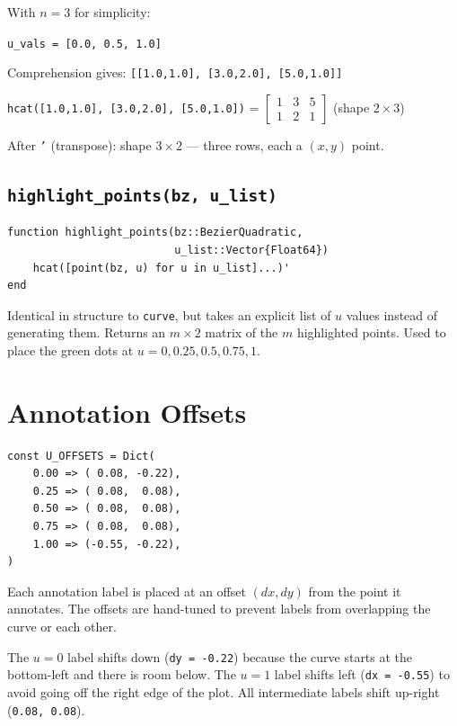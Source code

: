 \documentclass[12pt, a4paper]{article}
\newcommand{\cd}[1]{\texttt{#1}}
\begin{document}
\begin{examplebox}
With $n = 3$ for simplicity:

\cd{u\_vals = [0.0, 0.5, 1.0]}

Comprehension gives: \cd{[[1.0,1.0], [3.0,2.0], [5.0,1.0]]}

\cd{hcat([1.0,1.0], [3.0,2.0], [5.0,1.0])} =
$\begin{bmatrix} 1 & 3 & 5 \\ 1 & 2 & 1 \end{bmatrix}$ (shape $2 \times 3$)

After \cd{'} (transpose): shape $3 \times 2$ ---
three rows, each a $(x, y)$ point.
\end{examplebox}

\subsection{\texttt{highlight\_points(bz, u\_list)}}

\begin{verbatim}
function highlight_points(bz::BezierQuadratic,
                          u_list::Vector{Float64})
    hcat([point(bz, u) for u in u_list]...)'
end
\end{verbatim}

Identical in structure to \cd{curve}, but takes an
explicit list of $u$ values instead of generating them.
Returns an $m \times 2$ matrix of the $m$ highlighted
points.
Used to place the green dots at $u = 0, 0.25, 0.5, 0.75, 1$.


\section{Annotation Offsets}

\begin{verbatim}
const U_OFFSETS = Dict(
    0.00 => ( 0.08, -0.22),
    0.25 => ( 0.08,  0.08),
    0.50 => ( 0.08,  0.08),
    0.75 => ( 0.08,  0.08),
    1.00 => (-0.55, -0.22),
)
\end{verbatim}

Each annotation label is placed at an offset
$(dx, dy)$ from the point it annotates.
The offsets are hand-tuned to prevent labels from
overlapping the curve or each other.

The $u = 0$ label shifts down (\cd{dy = -0.22}) because
the curve starts at the bottom-left and there is room below.
The $u = 1$ label shifts left (\cd{dx = -0.55}) to
avoid going off the right edge of the plot.
All intermediate labels shift up-right (\cd{0.08, 0.08}).
\end{document}
